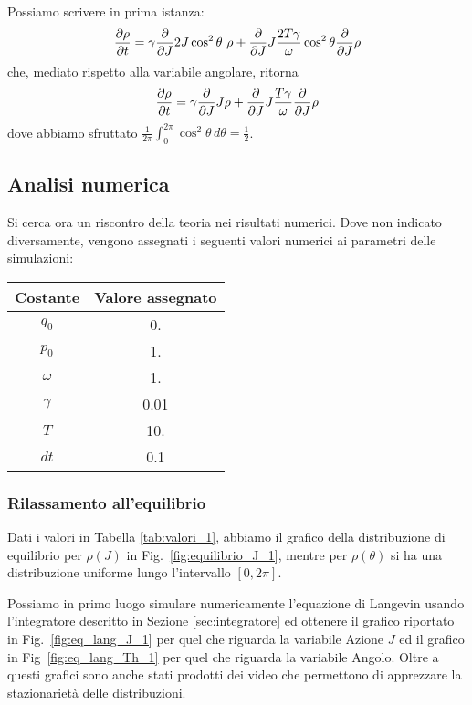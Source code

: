 \documentclass[10pt,a4paper]{article}
\begin{document}
Possiamo scrivere in prima istanza:
\begin{equation}
	\pdv{\rho}{t} = \gamma \pdv{}{J} 2J\cos^2\theta\,\,\rho + \pdv{}{J} J\frac{2T\gamma}{\omega}\cos^2\theta \pdv{}{J} \rho
\end{equation} 
che, mediato rispetto alla variabile angolare, ritorna
\begin{equation}
	\pdv{\rho}{t} = \gamma \pdv{}{J} J\rho + \pdv{}{J} J\frac{T\gamma}{\omega} \pdv{}{J} \rho
	\label{eq:pendolo_fokker_planck_1}
\end{equation}
dove abbiamo sfruttato \(\frac{1}{2\pi}\int_0^{2\pi}\cos^2\theta\, d\theta = \frac{1}{2}\).\\

\subsection{Analisi numerica}

Si cerca ora un riscontro della teoria nei risultati numerici. Dove non indicato diversamente, vengono assegnati i seguenti valori numerici ai parametri delle simulazioni:
\begin{center}
	\begin{tabular}{cS}
	\toprule
	Costante & {Valore assegnato} \\
	\midrule
	$q_0$		& 0.	\\
	$p_0$		& 1.	\\
	$\omega$	& 1.	\\
	$\gamma$	& 0.01	\\
	$T$			& 10.	\\
	$dt$		& 0.1	\\
	\bottomrule
	\end{tabular}
	\label{tab:valori_1}
\end{center}

\subsubsection{Rilassamento all'equilibrio}

Dati i valori in Tabella \ref{tab:valori_1}, abbiamo il grafico della distribuzione di equilibrio per \(\rho(J)\) in Fig.~\ref{fig:equilibrio_J_1}, mentre per \(\rho(\theta)\) si ha una distribuzione uniforme lungo l'intervallo \([0,2\pi]\).

Possiamo in primo luogo simulare numericamente l'equazione di Langevin usando l'integratore descritto in Sezione \ref{sec:integratore} ed ottenere il grafico riportato in Fig.~\ref{fig:eq_lang_J_1} per quel che riguarda la variabile Azione \(J\) ed il grafico in Fig~\ref{fig:eq_lang_Th_1} per quel che riguarda la variabile Angolo. Oltre a questi grafici sono anche stati prodotti dei video che permettono di apprezzare la stazionarietà delle distribuzioni.
\end{document}
